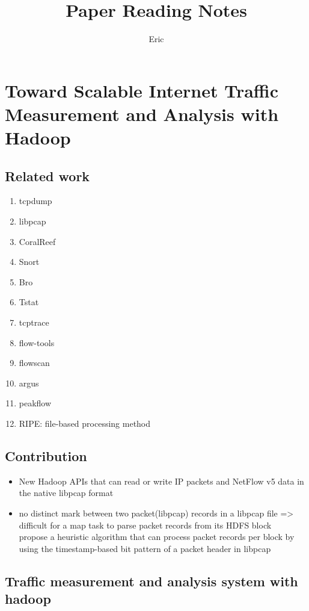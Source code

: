 \documentclass{article}
\begin{document}
\title{Paper Reading Notes}
\author{Eric}
\maketitle
\tableofcontents
\newpage

\section{Toward Scalable Internet Traffic Measurement and Analysis with Hadoop}
\label{toward-scalable-internet-traffic-measurement-and-analysis-with-hadoop}

\subsection{Related work}\label{related-work}
\begin{enumerate}
\item tcpdump
\item libpcap
\item CoralReef
\item Snort
\item Bro
\item Tstat
\item tcptrace
\item flow-tools
\item flowscan
\item argus
\item peakflow
\item RIPE: file-based processing method
\end{enumerate}

\subsection{Contribution}\label{contribution}
\begin{itemize}
\item New Hadoop APIs that can read or write IP packets and NetFlow v5 data
  in the native libpcap format
\item no distinct mark between two packet(libpcap) records in a libpcap file
  =\textgreater{} difficult for a map task to parse packet records from its HDFS block\\ 
  propose a heuristic algorithm that can process packet   records per block by using the timestamp-based bit pattern of a packet header in libpcap
\end{itemize}

\subsection{Traffic measurement and analysis system with hadoop}
\label{traffic-measurement-and-analysis-system-with-hadoop}
\end{document}
